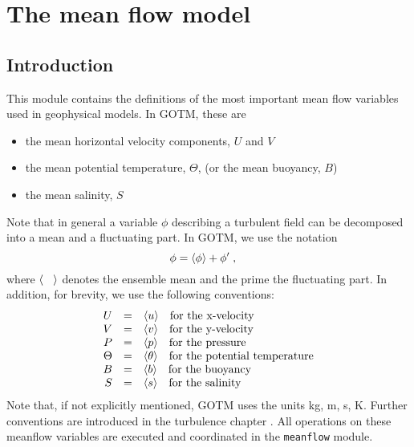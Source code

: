 %
%

\section{The mean flow model \label{sec:meanflowIntro}}

\subsection{Introduction}

This module contains the definitions of the most important
mean flow variables used in geophysical models. In GOTM, these
are
\begin{itemize}
  \item the mean horizontal velocity components, $U$ and $V$
  \item the mean potential temperature, $\Theta$, (or the mean buoyancy, $B$)
  \item the mean salinity, $S$
\end{itemize}
Note that in general a variable $\phi$ describing a turbulent
field can be decomposed into a mean and a fluctuating part. In GOTM, 
we use the notation
\begin{equation}
  \label{decomposition}
    \phi = {\langle \phi \rangle} + \phi'
   \; , \quad
\end{equation}
where $\mean{\rule{3mm}{0mm}}$ denotes the ensemble mean and the prime 
the fluctuating part. In addition, for brevity, we use the following conventions:
\begin{equation}
  \label{decompositionConventions}
   \begin{array}{rcl}
     U      &=& {\langle u \rangle}      \quad \text{for the x-velocity}            \\	
     V      &=& {\langle v \rangle}      \quad \text{for the y-velocity}            \\
     P      &=& {\langle p \rangle}      \quad \text{for the pressure}              \\
     \Theta &=& {\langle \theta \rangle} \quad \text{for the potential temperature} \\
     B      &=& {\langle b \rangle}      \quad \text{for the buoyancy}              \\
     S      &=& {\langle s \rangle}      \quad \text{for the salinity}             
   \end{array}
\end{equation}
Note that, if not explicitly mentioned, GOTM uses the units kg, m, s,
K. Further conventions are introduced in the turbulence chapter
. All operations on these meanflow variables
are executed and coordinated in the {\tt meanflow} module.

